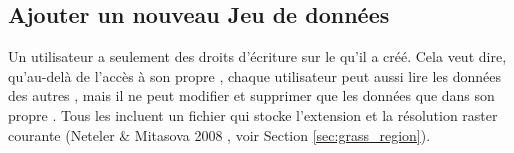 \subsection{Ajouter un nouveau Jeu de données}\label{sec:add_mapset}

Un utilisateur a seulement des droits d'écriture sur le  \grass qu'il a créé. Cela veut dire, qu'au-delà de l'accès à son propre  \grass, chaque utilisateur peut aussi lire les données des autres , mais il ne peut modifier et supprimer que les données que dans son propre . Tous les  incluent un fichier  qui stocke l'extension et la résolution raster courante (Neteler \& Mitasova 2008 \cite{neteler_mitasova08}, voir Section \ref{sec:grass_region}).

